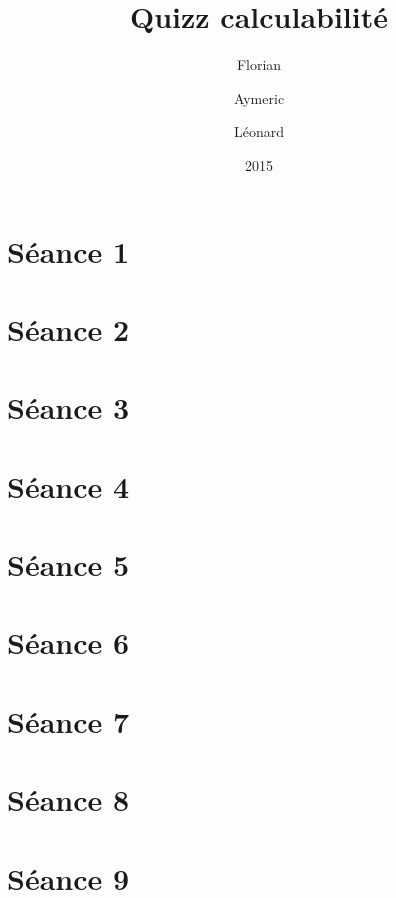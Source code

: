 \documentclass[a4paper, 12pt]{article}
\author{Florian \bsc{Thuin} \and Aymeric \bsc{De Cocq} \and Léonard \bsc{Julémont}}
\title{Quizz calculabilité}
\date{2015}
\begin{document}
\maketitle

\tableofcontents
\pagebreak

\section{Séance 1}



\section{Séance 2}



\section{Séance 3}



\section{Séance 4}



\section{Séance 5}



\section{Séance 6}



\section{Séance 7}



\section{Séance 8}



\section{Séance 9}
\end{document}
